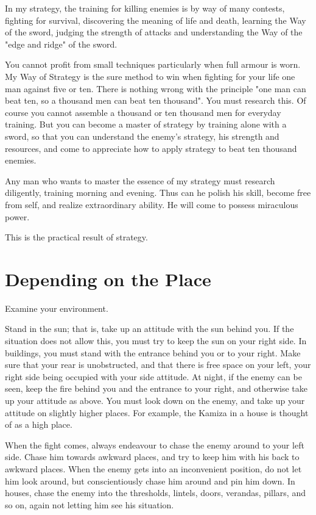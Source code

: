 \documentclass[12pt]{report}
\begin{document}
In my strategy, the training for killing enemies is by way of many contests, fighting for survival, discovering the meaning of life and death, learning the Way of the sword, judging the strength of attacks and understanding the Way of the "edge and ridge" of the sword.

You cannot profit from small techniques particularly when full armour is worn. My Way of Strategy is the sure method to win when fighting for your life one man against five or ten. There is nothing wrong with the principle "one man can beat ten, so a thousand men can beat ten thousand". You must research this. Of course you cannot assemble a thousand or ten thousand men for everyday training. But you can become a master of strategy by training alone with a sword, so that you can understand the enemy's strategy, his strength and resources, and come to appreciate how to apply strategy to beat ten thousand enemies.

Any man who wants to master the essence of my strategy must research diligently, training morning and evening. Thus can he polish his skill, become free from self, and realize extraordinary ability. He will come to possess miraculous power.

This is the practical result of strategy.
\section*{Depending on the Place}
Examine your environment.

Stand in the sun; that is, take up an attitude with the sun behind you. If the situation does not allow this, you must try to keep the sun on your right side. In buildings, you must stand with the entrance behind you or to your right. Make sure that your rear is unobstructed, and that there is free space on your left, your right side being occupied with your side attitude. At night, if the enemy can be seen, keep the fire behind you and the entrance to your right, and otherwise take up your attitude as above. You must look down on the enemy, and take up your attitude on slightly higher places. For example, the Kamiza in a house is thought of as a high place.

When the fight comes, always endeavour to chase the enemy around to your left side. Chase him towards awkward places, and try to keep him with his back to awkward places. When the enemy gets into an inconvenient position, do not let him look around, but conscientiously chase him around and pin him down. In houses, chase the enemy into the thresholds, lintels, doors, verandas, pillars, and so on, again not letting him see his situation.
\end{document}
